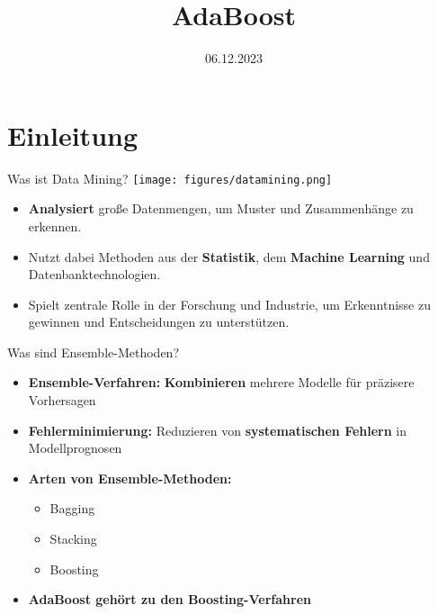 \documentclass[hyperref={bookmarks=false},11pt,dvipsnames]{beamer}
\author[\presenternameshort]{\presentername}
\institute{Bergische Universität Wuppertal}
\title{AdaBoost}
\date{06.12.2023}
\def\englishlanguage{0}             %
\def\printpagenumbers{1}            %
\begin{document}
\maketitle


\let\rememberpagenumberswitch\printpagenumbers
\def\printpagenumbers{0}

\begin{frame}[t,noframenumbering]{\ifthenelse{\englishlanguage=1}{Outline}{Inhalt}}
	\tableofcontents
\end{frame}
\let\printpagenumbers\rememberpagenumberswitch


%
%

\section{Einleitung}

\begin{frame}[t]{Was ist Data Mining?}
	\texttt{[image: figures/datamining.png]}
	\begin{itemize}
		\item <1-> \textbf{Analysiert} große Datenmengen, um Muster und Zusammenhänge zu erkennen.
		\item <2-> Nutzt dabei Methoden aus der \textbf{Statistik}, dem  \textbf{Machine Learning} und Datenbanktechnologien.
		\item <3-> Spielt zentrale Rolle in der Forschung und Industrie,
		      um Erkenntnisse zu gewinnen und
		      Entscheidungen zu unterstützen.
	\end{itemize}
\end{frame}
\begin{frame}[t]{Was sind Ensemble-Methoden?}
	\begin{itemize}
		\item <1-> \textbf{Ensemble-Verfahren:} \textbf{Kombinieren} mehrere Modelle für präzisere Vorhersagen
		\item <2-> \textbf{Fehlerminimierung:} Reduzieren von \textbf{systematischen Fehlern} in Modellprognosen
		\item <3-> \textbf{Arten von Ensemble-Methoden:}\\[5pt]
		      \begin{itemize}
			      \item Bagging
			      \item Stacking
			      \item Boosting
		      \end{itemize}
		\item <4-> \textbf{AdaBoost gehört zu den Boosting-Verfahren}
	\end{itemize}
\end{frame}
\end{document}
